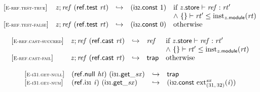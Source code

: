 \vspace{1ex}

$$
\begin{array}{@{}l@{}lcl@{}l@{}}
{[\textsc{\scriptsize E{-}ref.test{-}true}]} \quad & {\mathit{z}} ; {\mathit{ref}}~(\mathsf{ref.test}~{\mathit{rt}}) &\hookrightarrow& (\mathsf{i{\scriptstyle32}}.\mathsf{const}~1) &\quad
  \mbox{if}~{\mathit{z}}.\mathsf{store} \vdash {\mathit{ref}} : {\mathit{rt}'} \\
 &&&&\quad {\land}~\{ \begin{array}[t]{@{}l@{}}
 \}\end{array} \vdash {\mathit{rt}'} \leq {{\mathrm{inst}}}_{{\mathit{z}}.\mathsf{module}}({\mathit{rt}}) \\
{[\textsc{\scriptsize E{-}ref.test{-}false}]} \quad & {\mathit{z}} ; {\mathit{ref}}~(\mathsf{ref.test}~{\mathit{rt}}) &\hookrightarrow& (\mathsf{i{\scriptstyle32}}.\mathsf{const}~0) &\quad
  \mbox{otherwise} \\
\end{array}
$$

\vspace{1ex}

$$
\begin{array}{@{}l@{}lcl@{}l@{}}
{[\textsc{\scriptsize E{-}ref.cast{-}succeed}]} \quad & {\mathit{z}} ; {\mathit{ref}}~(\mathsf{ref.cast}~{\mathit{rt}}) &\hookrightarrow& {\mathit{ref}} &\quad
  \mbox{if}~{\mathit{z}}.\mathsf{store} \vdash {\mathit{ref}} : {\mathit{rt}'} \\
 &&&&\quad {\land}~\{ \begin{array}[t]{@{}l@{}}
 \}\end{array} \vdash {\mathit{rt}'} \leq {{\mathrm{inst}}}_{{\mathit{z}}.\mathsf{module}}({\mathit{rt}}) \\
{[\textsc{\scriptsize E{-}ref.cast{-}fail}]} \quad & {\mathit{z}} ; {\mathit{ref}}~(\mathsf{ref.cast}~{\mathit{rt}}) &\hookrightarrow& \mathsf{trap} &\quad
  \mbox{otherwise} \\
\end{array}
$$

\vspace{1ex}

$$
\begin{array}{@{}l@{}lcl@{}l@{}}
{[\textsc{\scriptsize E{-}i31.get{-}null}]} \quad & (\mathsf{ref.null}~{\mathit{ht}})~({{\mathsf{i{\scriptstyle31}.get}}{\mathsf{\_}}}{{\mathit{sx}}}) &\hookrightarrow& \mathsf{trap} &  \\
{[\textsc{\scriptsize E{-}i31.get{-}num}]} \quad & (\mathsf{ref.i{\scriptstyle31}}~{\mathit{i}})~({{\mathsf{i{\scriptstyle31}.get}}{\mathsf{\_}}}{{\mathit{sx}}}) &\hookrightarrow& (\mathsf{i{\scriptstyle32}}.\mathsf{const}~{{{{\mathrm{ext}}}_{(31,\, 32)}^{{\mathit{sx}}}}}{({\mathit{i}})}) &  \\
\end{array}
$$

